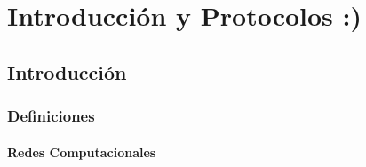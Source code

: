 \documentclass[12pt, fleqn]{report}                             %
\theoremstyle{break}                                            %
\begin{document}
\restoregeometry                                                    %
\nopagecolor                                                        %




\tableofcontents{}
\label{sec:Index}

\clearpage




\part{Introducción y Protocolos :)}
\clearpage

    
    \chapter{Introducción}


        \clearpage
        \section{Definiciones}

            \subsection{Redes Computacionales}
\end{document}

